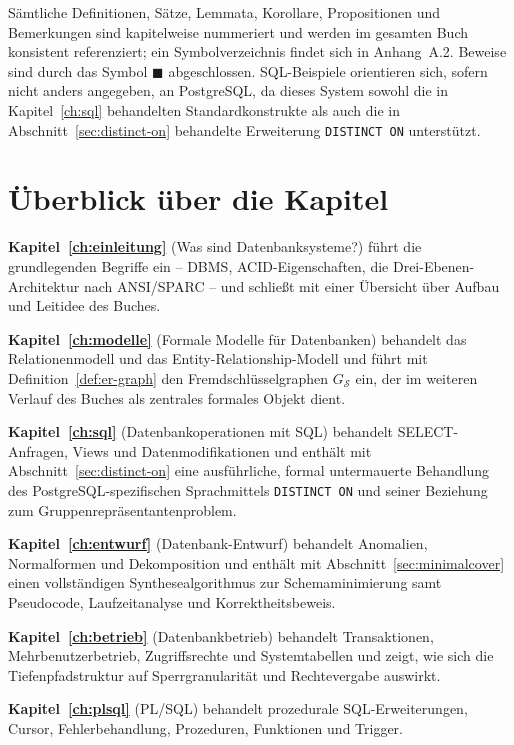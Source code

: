 ﻿\documentclass[a4paper,12pt]{report}
\theoremstyle{definition}
\theoremstyle{remark}
\begin{document}
Sämtliche Definitionen, Sätze, Lemmata, Korollare, Propositionen und
Bemerkungen sind kapitelweise nummeriert und werden im gesamten Buch
konsistent referenziert; ein Symbolverzeichnis findet sich in
Anhang~A.2. Beweise sind durch das Symbol $\blacksquare$
abgeschlossen. SQL-Beispiele orientieren sich, sofern nicht anders
angegeben, an PostgreSQL, da dieses System sowohl die in
Kapitel~\ref{ch:sql} behandelten Standardkonstrukte als auch die in
Abschnitt~\ref{sec:distinct-on} behandelte Erweiterung
\texttt{DISTINCT ON} unterstützt.

\section*{Überblick über die Kapitel}

\textbf{Kapitel~\ref{ch:einleitung}} (\glqq Was sind
Datenbanksysteme?\grqq{}) führt die grundlegenden Begriffe ein --
DBMS, ACID-Eigenschaften, die Drei-Ebenen-Architektur nach
ANSI/SPARC -- und schließt mit einer Übersicht über Aufbau und
Leitidee des Buches.

\textbf{Kapitel~\ref{ch:modelle}} (\glqq Formale Modelle für
Datenbanken\grqq{}) behandelt das Relationenmodell und das
Entity-Relationship-Modell und führt mit
Definition~\ref{def:er-graph} den Fremdschlüsselgraphen
$G_{\mathcal{S}}$ ein, der im weiteren Verlauf des Buches als
zentrales formales Objekt dient.

\textbf{Kapitel~\ref{ch:sql}} (\glqq Datenbankoperationen mit
SQL\grqq{}) behandelt SELECT-Anfragen, Views und
Datenmodifikationen und enthält mit
Abschnitt~\ref{sec:distinct-on} eine ausführliche, formal untermauerte
Behandlung des PostgreSQL-spezifischen Sprachmittels
\texttt{DISTINCT ON} und seiner Beziehung zum
Gruppenrepräsentantenproblem.

\textbf{Kapitel~\ref{ch:entwurf}} (\glqq Datenbank-Entwurf\grqq{})
behandelt Anomalien, Normalformen und Dekomposition und enthält mit
Abschnitt~\ref{sec:minimalcover} einen vollständigen
Synthesealgorithmus zur Schemaminimierung samt Pseudocode,
Laufzeitanalyse und Korrektheitsbeweis.

\textbf{Kapitel~\ref{ch:betrieb}} (\glqq Datenbankbetrieb\grqq{})
behandelt Transaktionen, Mehrbenutzerbetrieb, Zugriffsrechte und
Systemtabellen und zeigt, wie sich die Tiefenpfadstruktur auf
Sperrgranularität und Rechtevergabe auswirkt.

\textbf{Kapitel~\ref{ch:plsql}} (\glqq PL/SQL\grqq{}) behandelt
prozedurale SQL-Erweiterungen, Cursor, Fehlerbehandlung, Prozeduren,
Funktionen und Trigger.
\end{document}
